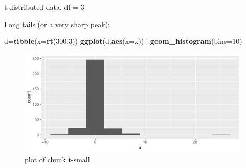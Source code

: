 \documentclass[ignorenonframetext,]{beamer}
\newenvironment{Shaded}{\begin{snugshade}}{\end{snugshade}}
\newcommand{\DataTypeTok}[1]{\textcolor[rgb]{0.13,0.29,0.53}{#1}}
\newcommand{\DecValTok}[1]{\textcolor[rgb]{0.00,0.00,0.81}{#1}}
\newcommand{\KeywordTok}[1]{\textcolor[rgb]{0.13,0.29,0.53}{\textbf{#1}}}
\newcommand{\NormalTok}[1]{#1}
\newcommand{\OperatorTok}[1]{\textcolor[rgb]{0.81,0.36,0.00}{\textbf{#1}}}
\begin{document}
\begin{frame}[fragile]{t-distributed data, df = 3}
\protect\hypertarget{t-distributed-data-df-3}{}

Long tails (or a very sharp peak):

\begin{Shaded}
\begin{Highlighting}[]
\NormalTok{d=}\KeywordTok{tibble}\NormalTok{(}\DataTypeTok{x=}\KeywordTok{rt}\NormalTok{(}\DecValTok{300}\NormalTok{,}\DecValTok{3}\NormalTok{))}
\KeywordTok{ggplot}\NormalTok{(d,}\KeywordTok{aes}\NormalTok{(}\DataTypeTok{x=}\NormalTok{x))}\OperatorTok{+}\KeywordTok{geom_histogram}\NormalTok{(}\DataTypeTok{bins=}\DecValTok{10}\NormalTok{)}
\end{Highlighting}
\end{Shaded}

\begin{figure}
\centering
\includegraphics{figure/t-small-1.pdf}
\caption{plot of chunk t-small}
\end{figure}

\end{frame}
\end{document}
